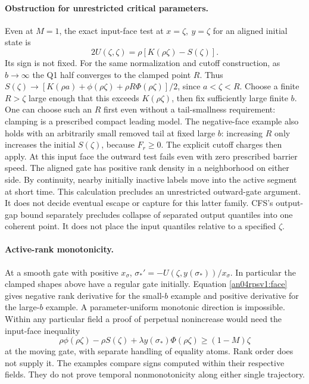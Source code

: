 \documentclass[11pt]{article}
\begin{document}
\paragraph{Obstruction for unrestricted critical parameters.}
Even at \(M=1\), the exact input-face test at \(x=\zeta,\ y=\zeta\)
for an aligned initial state is
\begin{equation}\label{an04rpsv1:face}
 2U(\zeta,\zeta)=\rho[K(\rho\zeta)-S(\zeta)] .
\end{equation}
Its sign is not fixed. For the same normalization and cutoff construction,
as \(b\to\infty\) the Q1 half converges to the clamped point \(R\).
Thus \(S(\zeta)\to [K(\rho a)+\phi(\rho\zeta)+
\rho R\Phi(\rho\zeta)]/2\), since \(a<\zeta<R\).
Choose a finite \(R>\zeta\) large enough that this exceeds
\(K(\rho\zeta)\), then fix sufficiently large finite \(b\).
One can choose such an \(R\) first even without a tail-smallness
requirement: clamping is a prescribed compact leading model. The
negative-face example also holds with an arbitrarily small removed
tail at fixed large \(b\): increasing \(R\) only increases the
initial \(S(\zeta)\), because \(F_r\ge0\). The explicit cutoff
charges then apply. At this input face the outward test fails even
with zero prescribed barrier speed. The aligned gate has positive
rank density in a neighborhood on either side. By continuity, nearby
initially inactive labels move into the active segment at short time.
This calculation precludes an unrestricted outward-gate argument.
It does not decide eventual escape or capture for this latter family.
CFS's output-gap bound separately precludes collapse of separated
output quantiles into one coherent point. It does not place the input
quantiles relative to a specified \(\zeta\).

\paragraph{Active-rank monotonicity.}
At a smooth gate with positive \(x_\sigma\),
\(\sigma_*'=-U(\zeta,y(\sigma_*))/x_\sigma\).
In particular the clamped shapes above have a regular gate initially.
Equation \eqref{an04rpsv1:face} gives negative rank derivative for
the small-\(b\) example and positive derivative for the large-\(b\)
example. A parameter-uniform monotonic direction is impossible.
Within any particular field a proof of perpetual nonincrease would
need the input-face inequality
\[
 \rho\phi(\rho\zeta)-\rho S(\zeta)+\lambda y(\sigma_*)\Phi(\rho\zeta)
 \ge(1-M)\zeta
\]
at the moving gate, with separate handling of equality atoms.
Rank order does not supply it. The examples compare signs computed
within their respective fields. They do not prove temporal
nonmonotonicity along either single trajectory.
\end{document}
